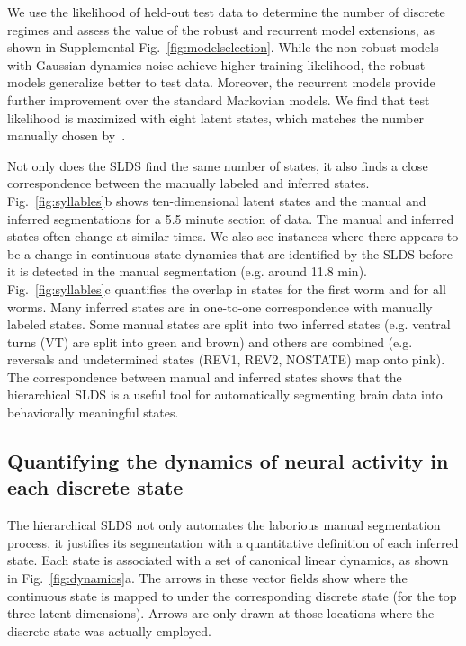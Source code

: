 \documentclass[11pt]{article}
\begin{document}
We use the likelihood of held-out test data to determine
the number of discrete regimes and assess the value of the robust and
recurrent model extensions, as shown in Supplemental Fig.~\ref{fig:modelselection}.
While the non-robust models with Gaussian dynamics noise achieve
higher training likelihood, the robust models generalize better to
test data.  Moreover, the recurrent models provide further improvement
over the standard Markovian models.  We find that test likelihood is
maximized with eight latent states, which matches the number manually
chosen by~\citet{kato2015global}.

Not only does the SLDS find the same number of states, it also finds a
close correspondence between the manually labeled and inferred states.
Fig.~\ref{fig:syllables}b shows ten-dimensional latent states and the
manual and inferred segmentations for a 5.5 minute section of data.
The manual and inferred states often change at similar times. We also
see instances where there appears to be a change in continuous state
dynamics that are identified by the SLDS before it is detected in the
manual segmentation (e.g. around 11.8 min).  Fig.~\ref{fig:syllables}c
quantifies the overlap in states for the first worm and for all worms.
Many inferred states are in one-to-one correspondence with manually
labeled states. Some manual states are split into two inferred states
(e.g. ventral turns (\textsf{VT}) are split into green and brown) and
others are combined (e.g. reversals and undetermined states
(\textsf{REV1}, \textsf{REV2}, \textsf{NOSTATE}) map onto pink).
The correspondence between manual and inferred states shows that
the hierarchical SLDS is a useful tool for automatically segmenting
brain data into behaviorally meaningful states.


\subsection*{Quantifying the dynamics of neural activity in each discrete state}
The hierarchical SLDS not only automates the laborious manual
segmentation process, it justifies its segmentation with a
quantitative definition of each inferred state. Each state is
associated with a set of canonical linear dynamics, as shown in
Fig.~\ref{fig:dynamics}a. The arrows in these vector fields show where
the continuous state is mapped to under the corresponding discrete
state (for the top three latent dimensions).  Arrows are only drawn
at those locations where the discrete state was actually employed.
\end{document}
